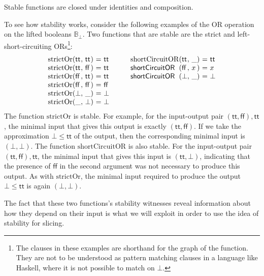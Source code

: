 \begin{lemma}
  Stable functions are closed under identities and composition.
\end{lemma}

\begin{example}
  To see how stability works, consider the following examples of the
  OR operation on the lifted booleans $\mathbb{B}_\bot$. Two functions
  that are stable are the strict and left-short-circuiting
  ORs\footnote{The clauses in these examples are shorthand for the
    graph of the function. They are not to be understood as pattern
    matching clauses in a language like Haskell, where it is not
    possible to match on $\bot$.}:
  \begin{displaymath}
    \begin{array}[t]{l@{(}l@{,~}l@{)~}c@{~}l}
      \mathrm{strictOr}&\mathsf{tt}&\mathsf{tt}&=&\mathsf{tt} \\
      \mathrm{strictOr}&\mathsf{tt}&\mathsf{ff}&=&\mathsf{tt} \\
      \mathrm{strictOr}&\mathsf{ff}&\mathsf{tt}&=&\mathsf{tt} \\
      \mathrm{strictOr}&\mathsf{ff}&\mathsf{ff}&=&\mathsf{ff} \\
      \mathrm{strictOr}&\bot&\_&=&\bot \\
      \mathrm{strictOr}&\_&\bot&=&\bot \\
    \end{array}
    \qquad
    \begin{array}[t]{l@{(}l@{,~}l@{)~}c@{~}l}
      \mathrm{shortCircuitOR}&\mathsf{tt}&\_&=&\mathsf{tt} \\
      \mathsf{shortCircuitOR}&\mathsf{ff}&x&=&x \\
      \mathsf{shortCircuitOR}&\bot&\_& =& \bot
    \end{array}
  \end{displaymath}
  The function $\mathrm{strictOr}$ is stable. For example, for the
  input-output pair $(\mathsf{tt},\mathsf{ff}), \mathsf{tt}$, the
  minimal input that gives this output is exactly
  $(\mathsf{tt}, \mathsf{ff})$. If we take the approximation
  $\bot \leq \mathsf{tt}$ of the output, then the corresponding
  minimal input is $(\bot, \bot)$. The function
  $\mathrm{shortCircuitOR}$ is also stable. For the input-output pair
  $(\mathsf{tt},\mathsf{ff}),\mathsf{tt}$, the minimal input that
  gives this input is $(\mathsf{tt},\bot)$, indicating that the
  presence of $\mathsf{ff}$ in the second argument was not necessary
  to produce this output. As with $\mathrm{strictOr}$, the minimal
  input required to produce the output $\bot \leq \mathsf{tt}$ is
  again $(\bot,\bot)$.

  The fact that these two functions's stability witnesses reveal
  information about how they depend on their input is what we will
  exploit in order to use the idea of stability for slicing.
\end{example}

